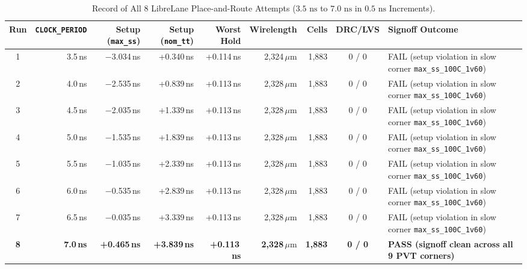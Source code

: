 \documentclass[conference,10pt]{IEEEtran}
\begin{document}
\begin{table}[!t]
    \centering
    \caption{Record of All 8 LibreLane Place-and-Route Attempts ($3.5\text{ ns}$ to $7.0\text{ ns}$ in $0.5\text{ ns}$ Increments).}
    \label{tab:partD_sweep}
    \footnotesize
    \setlength{\tabcolsep}{5pt}
    \begin{tabularx}{\textwidth}{@{}c r r r r r r c X@{}}
        \toprule
        \textbf{Run} & \textbf{\texttt{CLOCK\_PERIOD}} & \textbf{Setup (\texttt{max\_ss})} & \textbf{Setup (\texttt{nom\_tt})} & \textbf{Worst Hold} & \textbf{Wirelength} & \textbf{Cells} & \textbf{DRC/LVS} & \textbf{Signoff Outcome} \\
        \midrule
        1 & 3.5\,ns & $-$3.034\,ns & +0.340\,ns & +0.114\,ns & 2,324\,$\mu\text{m}$ & 1,883 & 0 / 0 & FAIL (setup violation in slow corner \texttt{max\_ss\_100C\_1v60}) \\
        2 & 4.0\,ns & $-$2.535\,ns & +0.839\,ns & +0.113\,ns & 2,328\,$\mu\text{m}$ & 1,883 & 0 / 0 & FAIL (setup violation in slow corner \texttt{max\_ss\_100C\_1v60}) \\
        3 & 4.5\,ns & $-$2.035\,ns & +1.339\,ns & +0.113\,ns & 2,328\,$\mu\text{m}$ & 1,883 & 0 / 0 & FAIL (setup violation in slow corner \texttt{max\_ss\_100C\_1v60}) \\
        4 & 5.0\,ns & $-$1.535\,ns & +1.839\,ns & +0.113\,ns & 2,328\,$\mu\text{m}$ & 1,883 & 0 / 0 & FAIL (setup violation in slow corner \texttt{max\_ss\_100C\_1v60}) \\
        5 & 5.5\,ns & $-$1.035\,ns & +2.339\,ns & +0.113\,ns & 2,328\,$\mu\text{m}$ & 1,883 & 0 / 0 & FAIL (setup violation in slow corner \texttt{max\_ss\_100C\_1v60}) \\
        6 & 6.0\,ns & $-$0.535\,ns & +2.839\,ns & +0.113\,ns & 2,328\,$\mu\text{m}$ & 1,883 & 0 / 0 & FAIL (setup violation in slow corner \texttt{max\_ss\_100C\_1v60}) \\
        7 & 6.5\,ns & $-$0.035\,ns & +3.339\,ns & +0.113\,ns & 2,328\,$\mu\text{m}$ & 1,883 & 0 / 0 & FAIL (setup violation in slow corner \texttt{max\_ss\_100C\_1v60}) \\
        \textbf{8} & \textbf{7.0\,ns} & \textbf{+0.465\,ns} & \textbf{+3.839\,ns} & \textbf{+0.113\,ns} & \textbf{2,328\,$\mu\text{m}$} & \textbf{1,883} & \textbf{0 / 0} & \textbf{PASS (signoff clean across all 9 PVT corners)} \\
        \bottomrule
    \end{tabularx}
\end{table}
\end{document}
